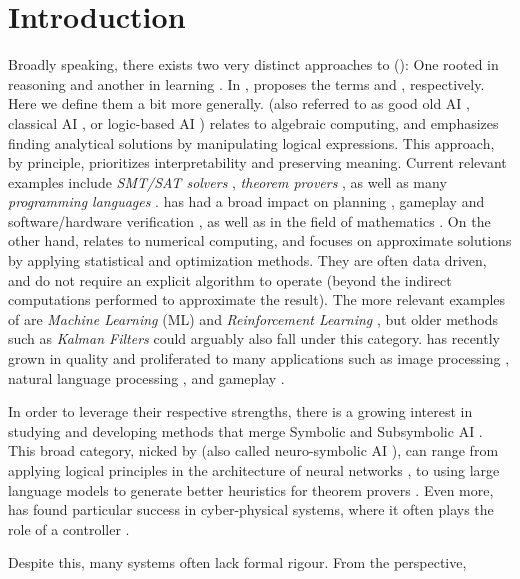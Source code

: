 \chapter{Introduction} \label{Chapter:Introduction}



Broadly speaking, there exists  two very distinct approaches to \emph{\AILong{}}  (\emph{\AI{}}): One rooted in reasoning and another in learning \mcite{}.  In , \citeauthor{Platzer_2024} proposes the terms \emph{\SiAI{}} and \emph{\SuAI{}}, respectively. Here we define them a bit more generally. \SiAI{} (also referred to as good old AI \mcite{}, classical AI \mcite{},  or logic-based AI \mcite{} ) relates to algebraic computing, and emphasizes finding analytical solutions by manipulating logical expressions. This approach, by principle, prioritizes interpretability and preserving meaning. Current relevant examples include \emph{SMT/SAT solvers} \mcite{}, \emph{theorem provers} \mcite{},  as well as many \emph{programming languages} \mcite{}.   \SiAI{} has had a broad impact on planning \mcite{}, gameplay \mcite{} and software/hardware verification \mcite{}, as well as in the field of mathematics \mcite{}.  On the other hand, \SuAI{} relates to numerical computing,  and focuses on approximate solutions by applying statistical and optimization methods. They are often data driven, and do not require an explicit algorithm to operate (beyond the indirect computations performed to approximate the result). The more relevant examples of \SuAI{} are \emph{Machine Learning} (ML) \mcite{} and \emph{Reinforcement Learning} \mcite{}, but older methods such as \emph{Kalman Filters} \mcite{} could arguably also fall under this category.  \SuAI{} has recently grown in quality and proliferated to many applications such as image processing \mcite{}, natural language processing \mcite{}, and gameplay \mcite{}. 

In order to leverage their respective strengths, there is a growing interest in studying and developing methods that merge Symbolic and Subsymbolic AI \mcite{}. This broad category, nicked \emph{\InAI{}} by \citeauthor{Platzer_2024} (also called neuro-symbolic AI \mcite{}), can range from applying logical principles in the architecture of neural networks \mcite{}, to using large language models to generate better heuristics for theorem provers \mcite{}. Even more, \InAI{} has found particular success in cyber-physical systems, where it often plays the role of a controller \mcite{}. 

Despite this, many \InAI{} systems often lack formal rigour. From the \SiAI{} perspective, \yada


\TODO
